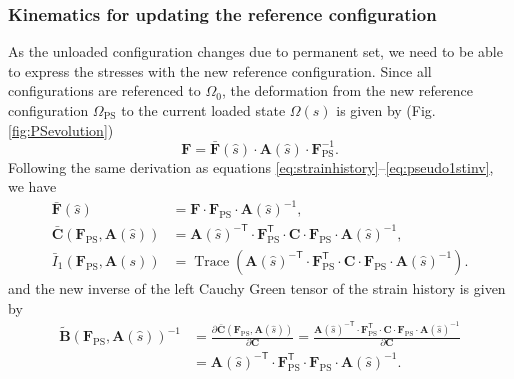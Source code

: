 
\subsubsection{Kinematics for updating the reference configuration}

    As the unloaded configuration changes due to permanent set, we need to be able to express the stresses with the new reference configuration. Since all configurations are referenced to $\Omega_0$, the deformation from the new reference configuration $\Omega_\mathrm{PS}$ to the current loaded state $\Omega(s)$ is given by (Fig. \ref{fig:PSevolution})
\begin{equation}
\mathbf{F} = \mathbf{\bar{F}}(\hat{s}) \cdot \mathbf{A}(\hat{s}) \cdot \mathbf{F}_\mathrm{PS}^{-1}.
\end{equation}
    Following the same derivation as equations \ref{eq:strainhistory}--\ref{eq:pseudo1stinv}, we have
\begin{equation} \label{eq:newhistory}
\begin{split}
\mathbf{\bar{F}}(\hat{s}) &= \mathbf{F} \cdot \mathbf{F}_\mathrm{PS} \cdot \mathbf{A}(\hat{s})^{-1},\\
\mathbf{\bar{C}}(\mathbf{F}_\mathrm{PS}, \mathbf{A}(\hat{s})) &= \mathbf{A}(\hat{s})^{-\mathsf{T}} \cdot \mathbf{F}_\mathrm{PS}^\mathsf{T} \cdot \mathbf{C} \cdot \mathbf{F}_\mathrm{PS} \cdot \mathbf{A}(\hat{s})^{-1}, \\
\bar{I}_1\left(\mathbf{F}_\mathrm{PS}, \mathbf{A}(s)\right) &= \operatorname{Trace}\left(\mathbf{A}(\hat{s})^{-\mathsf{T}} \cdot \mathbf{F}_\mathrm{PS}^\mathsf{T} \cdot \mathbf{C} \cdot \mathbf{F}_\mathrm{PS} \cdot \mathbf{A}(\hat{s})^{-1}\right). 
\end{split}
\end{equation}
    and the new inverse of the left Cauchy Green tensor of the strain history is given by
\begin{equation}
\begin{split}
\mathbf{\tilde{B}}(\mathbf{F}_\mathrm{PS}, \mathbf{A}(\hat{s}))^{-1} &= \frac{\partial \mathbf{\bar{C}}(\mathbf{F}_\mathrm{PS}, \mathbf{A}(\hat{s}))}{\partial \mathbf{C}} = \frac{\mathbf{A}(\hat{s})^{-\mathsf{T}} \cdot \mathbf{F}_\mathrm{PS}^\mathsf{T} \cdot \mathbf{C} \cdot \mathbf{F}_\mathrm{PS} \cdot \mathbf{A}(\hat{s})^{-1}}{\partial \mathbf{C}} \\
 &= \mathbf{A}(\hat{s})^{-\mathsf{T}} \cdot \mathbf{F}_\mathrm{PS}^\mathsf{T} \cdot \mathbf{F}_\mathrm{PS} \cdot \mathbf{A}(\hat{s})^{-1}. 
\end{split}
\end{equation}

